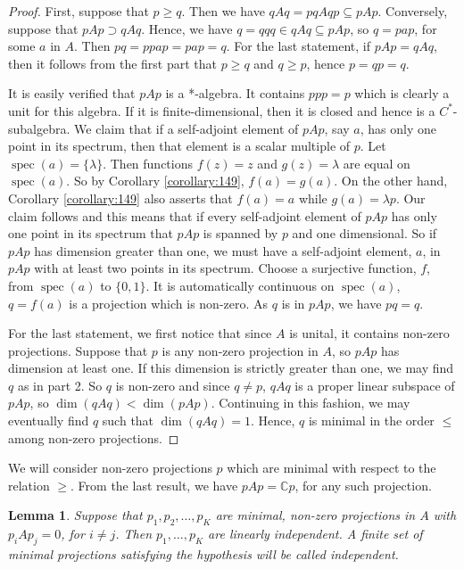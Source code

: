 \documentclass{book}
\newtheorem{lemma}[definition]{Lemma}
\begin{document}
\begin{proof}
  First, suppose that \(p \geq q\). Then we have \(qAq = pqAqp \subseteq pAp\).
  Conversely, suppose that \(pAp \supset qAq\). Hence, we have \(q = qqq \in qAq \subseteq pAp\),
  so \(q = pap\), for some \(a\) in \(A\). Then \(pq = ppap = pap = q\). For the last
  statement, if \(pAp = qAq\), then it follows from the first part that \(p \geq q\) and
  \(q \geq p\), hence \(p = qp = q\).\par
  It is easily verified that \(pAp\) is a *-algebra. It contains \(ppp = p\)
  which is clearly a unit for this algebra. If it is finite-dimensional, then it is
  closed and hence is a \(C^*\)-subalgebra. We claim that if a self-adjoint element
  of \(pAp\), say \(a\), has only one point in its spectrum, then that element is a scalar
  multiple of \(p\). Let \(\operatorname{spec}(a) = \{\lambda\}\). Then functions \(f(z) = z\) and \(g(z) = \lambda\) are
  equal on \(\operatorname{spec}(a)\). So by Corollary \ref{corollary:149}, \(f(a) = g(a)\). On the other hand,
  Corollary \ref{corollary:149} also asserts that \(f(a) = a\) while \(g(a) = \lambda p\). Our claim follows
  and this means that if every self-adjoint element of \(pAp\) has only one point
  in its spectrum that \(pAp\) is spanned by \(p\) and one dimensional. So if \(pAp\) has
  dimension greater than one, we must have a self-adjoint element, \(a\), in \(pAp\)
  with at least two points in its spectrum. Choose a surjective function, \(f\),
  from \(\operatorname{spec}(a)\) to \(\{0,1\}\). It is automatically continuous on \(\operatorname{spec}(a)\), \(q = f(a)\)
  is a projection which is non-zero. As \(q\) is in \(pAp\), we have \(pq = q\).\par
  For the last statement, we first notice that since \(A\) is unital, it contains
  non-zero projections. Suppose that \(p\) is any non-zero projection in \(A\), so
  \(pAp\) has dimension at least one. If this dimension is strictly greater than
  one, we may find \(q\) as in part 2. So \(q\) is non-zero and since \(q\neq p\), \(qAq\) is
  a proper linear subspace of \(pAp\), so \(\dim(qAq) < \dim(pAp)\). Continuing in
  this fashion, we may eventually find \(q\) such that \(\dim(qAq) = 1\). Hence, \(q\) is
  minimal in the order \(\leq\) among non-zero projections.
\end{proof}
We will consider non-zero projections \(p\) which are minimal with respect
to the relation \(\geq\). From the last result, we have \(pAp = \mathbb{C}p\), for any such
projection.
\begin{lemma}\label{lemma:177}
  Suppose that \(p_1,p_2,\ldots,p_K\) are minimal, non-zero projections
  in \(A\) with \(p_i Ap_j = 0\), for \(i\neq j\). Then \(p_1,\ldots,p_K\) are linearly independent.
  A finite set of minimal projections satisfying the hypothesis will be called
  independent.
\end{lemma}
\end{document}
